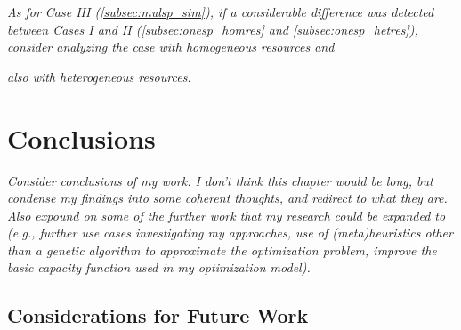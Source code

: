 \documentclass[12pt,dvipsnames]{report}
\begin{document}
\textit{As for Case III (\ref{subsec:mulsp_sim}), if a considerable difference was detected between Cases I and II (\ref{subsec:onesp_homres} and \ref{subsec:onesp_hetres}), consider analyzing the case with homogeneous resources and}


\textit{also with heterogeneous resources.}
\fi

\fi

\iftrue
\pagebreak
\chapter{Conclusions} \label{ch:conc}

%
\textit{Consider conclusions of my work.  I don't think this chapter would be long, but condense my findings into some coherent thoughts, and redirect to what they are.  Also expound on some of the further work that my research could be expanded to (e.g., further use cases investigating my approaches, use of (meta)heuristics other than a genetic algorithm to approximate the optimization problem, improve the basic capacity function used in my optimization model).}

\section{Considerations for Future Work} \label{sec:futurework}

\end{document}
